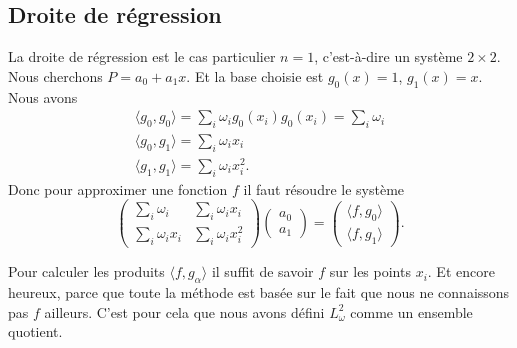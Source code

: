 \subsection{Droite de régression}

La droite de régression est le cas particulier \( n=1\), c'est-à-dire un système \( 2\times 2\). Nous cherchons \( P=a_0+a_1x\). Et la base choisie est \( g_0(x)=1\), \( g_1(x)=x\). Nous avons
\begin{subequations}
	\begin{align}
		\langle g_0, g_0\rangle =\sum_i\omega_ig_0(x_i)g_0(x_i)=\sum_i\omega_i \\
		\langle g_0, g_1\rangle =\sum_i\omega_ix_i                             \\
		\langle g_1, g_1\rangle =\sum_i\omega_ix_i^2.
	\end{align}
\end{subequations}
Donc pour approximer une fonction \( f\) il faut résoudre le système
\begin{equation}
	\begin{pmatrix}
		\sum_i\omega_i    & \sum_i\omega_ix_i   \\
		\sum_i\omega_ix_i & \sum_i\omega_ix_i^2
	\end{pmatrix}\begin{pmatrix}
		a_0 \\
		a_1
	\end{pmatrix}=
	\begin{pmatrix}
		\langle f, g_0\rangle \\
		\langle f, g_1\rangle
	\end{pmatrix}.
\end{equation}

Pour calculer les produits \( \langle f, g_{\alpha}\rangle \) il suffit de savoir \( f\) sur les points \( x_i\). Et encore heureux, parce que toute la méthode est basée sur le fait que nous ne connaissons pas \( f\) ailleurs. C'est pour cela que nous avons défini \( L^2_{\omega}\) comme un ensemble quotient.

